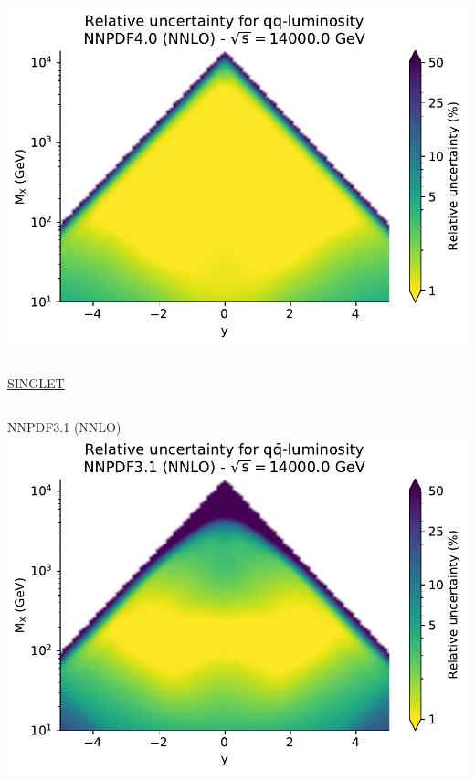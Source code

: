\documentclass{beamer}
\begin{document}
\begin{frame}
\begin{overlayarea}{\textwidth}{5.2cm}
{\begin{columns}[c]
\begin{column}{0.5\textwidth}
        \includegraphics[width=\columnwidth]{plots/plot_lumi2d_uncertainty_NNPDF40_qq}\\    
   \end{column}
  \end{columns}
  }
  {
  \centering
  \underline{SINGLET}\\
  \begin{columns}[c]
   \begin{column}{0.5\textwidth}
    \centering
        NNPDF3.1 (NNLO)\\
        \vspace{0.1cm}
        \includegraphics[width=\columnwidth]{plots/plot_lumi2d_uncertainty_NNPDF31_qqbar}\\
   \end{column}

\end{columns}}
\end{overlayarea}
\end{frame}
\end{document}
